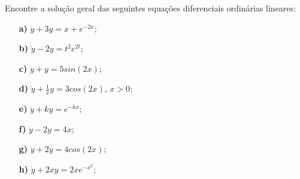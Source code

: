 \linespread{1.5}
Encontre a solução geral das seguintes equações diferenciais ordinárias lineares:
\begin{itemize}
    \item[\textbf{a)}] $\dot{y} + 3y = x + e^{-2x}$;
    \item[\textbf{b)}] $\dot{y} - 2y = t^2e^{2t}$;
    \item[\textbf{c)}] $\dot{y} + y = 5sin(2x)$;
    \item[\textbf{d)}] $\dot{y} + \frac{1}{x}y = 3cos(2x)$, $x>0$;
    \item[\textbf{e)}] $\dot{y} + ky = e^{-kx}$;
    \item[\textbf{f)}] $\dot{y} - 2y = 4x$;
    \item[\textbf{g)}] $\dot{y} + 2y = 4cos(2x)$;
    \item[\textbf{h)}] $\dot{y} + 2xy = 2xe^{-x^2}$;
\end{itemize}